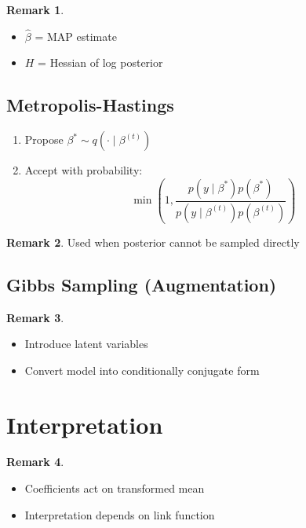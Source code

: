 \documentclass[12pt,oneside]{book}
\numberwithin{equation}{section}
\theoremstyle{definition}
\newtheorem{remark}{Remark}[section]
\theoremstyle{plain}
\theoremstyle{remark}
\begin{document}
\begin{remark}
\begin{itemize}
\item $\hat{\beta}$ = MAP estimate
\item $H$ = Hessian of log posterior
\end{itemize}
\end{remark}

\subsection{Metropolis-Hastings}

\begin{algorithm}
\begin{enumerate}
\item Propose $\beta^\ast \sim q(\cdot \mid \beta^{(t)})$
\item Accept with probability:
$$
\min\left(1,
\frac{p(y \mid \beta^\ast)p(\beta^\ast)}
     {p(y \mid \beta^{(t)})p(\beta^{(t)})}
\right)
$$
\end{enumerate}
\end{algorithm}

\begin{remark}
Used when posterior cannot be sampled directly  
\end{remark}

\subsection{Gibbs Sampling (Augmentation)}

\begin{remark}
\begin{itemize}
\item Introduce latent variables
\item Convert model into conditionally conjugate form
\end{itemize}
\end{remark}

\section{Interpretation}

\begin{remark}
\begin{itemize}
\item Coefficients act on transformed mean
\item Interpretation depends on link function
\end{itemize}
\end{remark}
\end{document}
